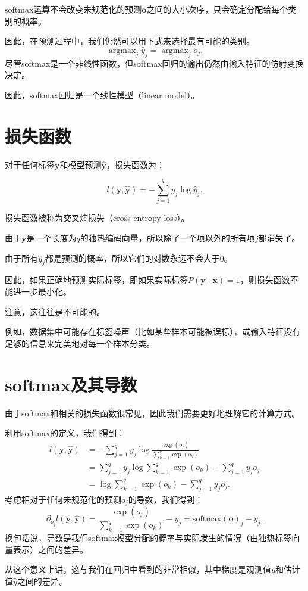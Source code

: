 \documentclass[openany,11pt]{book}
\begin{document}
softmax运算不会改变未规范化的预测$\mathbf{o}$之间的大小次序，只会确定分配给每个类别的概率。

因此，在预测过程中，我们仍然可以用下式来选择最有可能的类别。
$$
\operatorname{argmax}_j \hat y_j = \operatorname{argmax}_j o_j.
$$
尽管softmax是一个非线性函数，但softmax回归的输出仍然由输入特征的仿射变换决定。

因此，softmax回归是一个线性模型（linear model）。


\chapter{损失函数}

对于任何标签$\mathbf{y}$和模型预测$\hat{\mathbf{y}}$，损失函数为：

$$ l(\mathbf{y}, \hat{\mathbf{y}}) = - \sum_{j=1}^q y_j \log \hat{y}_j. $$

损失函数被称为交叉熵损失（cross-entropy loss）。

由于$\mathbf{y}$是一个长度为$q$的独热编码向量，所以除了一个项以外的所有项$j$都消失了。

由于所有$\hat{y}_j$都是预测的概率，所以它们的对数永远不会大于$0$。

因此，如果正确地预测实际标签，即如果实际标签$P(\mathbf{y} \mid \mathbf{x})=1$，则损失函数不能进一步最小化。

注意，这往往是不可能的。

例如，数据集中可能存在标签噪声（比如某些样本可能被误标），或输入特征没有足够的信息来完美地对每一个样本分类。


\chapter{softmax及其导数}
由于softmax和相关的损失函数很常见，因此我们需要更好地理解它的计算方式。

利用softmax的定义，我们得到：
$$
\begin{aligned}
	l(\mathbf{y}, \hat{\mathbf{y}}) &=  - \sum_{j=1}^q y_j \log \frac{\exp(o_j)}{\sum_{k=1}^q \exp(o_k)} \\
	&= \sum_{j=1}^q y_j \log \sum_{k=1}^q \exp(o_k) - \sum_{j=1}^q y_j o_j\\
	&= \log \sum_{k=1}^q \exp(o_k) - \sum_{j=1}^q y_j o_j.
\end{aligned}
$$
考虑相对于任何未规范化的预测$o_j$的导数，我们得到：
$$
\partial_{o_j} l(\mathbf{y}, \hat{\mathbf{y}}) = \frac{\exp(o_j)}{\sum_{k=1}^q \exp(o_k)} - y_j = \mathrm{softmax}(\mathbf{o})_j - y_j.
$$
换句话说，导数是我们softmax模型分配的概率与实际发生的情况（由独热标签向量表示）之间的差异。

从这个意义上讲，这与我们在回归中看到的非常相似，其中梯度是观测值$y$和估计值$\hat{y}$之间的差异。
\end{document}
